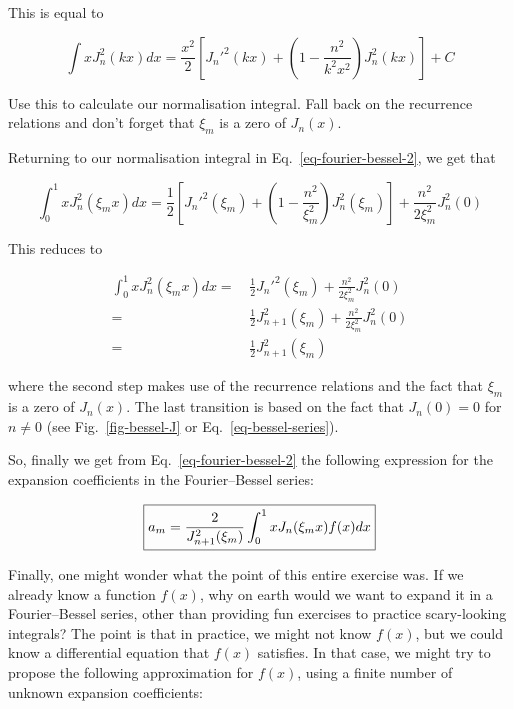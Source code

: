 This is equal to

\begin{equation}
\int x J_n^2(k x) dx = \frac{x^2}{2}\left[{J_n'^2(kx) + \left(1 - \frac{n^2}{k^2x^2}\right) J_n^2(kx)}\right] + C
\end{equation} 

\begin{cue}
Use this to calculate our normalisation integral. Fall back on the recurrence relations and don't forget that $\xi_m$ is a zero of $J_n(x)$.
\end{cue}

Returning to our normalisation integral in Eq.~\ref{eq-fourier-bessel-2}, we get that

\begin{equation}
\int_0^1 x J_n^2(\xi_m x) dx = \frac{1}{2}\left[{J_n'^2(\xi_m) + \left(1 - \frac{n^2}{\xi_m^2}\right) J_n^2(\xi_m)}\right] + \frac{n^2}{2\xi_m^2} J_n^2(0)
\end{equation} 

This reduces to

\begin{align}
\int_0^1 x J_n^2(\xi_m x) dx =& \, \frac{1}{2}J_n'^2(\xi_m) + \frac{n^2}{2\xi_m^2} J_n^2(0) \nonumber \\
 =& \, \frac{1}{2}J_{n+1}^2(\xi_m) + \frac{n^2}{2\xi_m^2} J_n^2(0) \nonumber \\
 =& \, \frac{1}{2}J_{n+1}^2(\xi_m)
\end{align} 

where the second step makes use of the recurrence relations and the fact that $\xi_m$ is a zero of $J_n(x)$. The last transition is based on the fact that $J_n(0)=0$ for $n \ne 0$ (see Fig.~\ref{fig-bessel-J} or Eq.~\ref{eq-bessel-series}).

So, finally we get from Eq.~\ref{eq-fourier-bessel-2} the following expression for the expansion coefficients in the Fourier--Bessel series:

\begin{equation}
\fbox{$\displaystyle
a_m = \frac{2}{J_{n+1}^2(\xi_m)}\int_0^1 x J_n(\xi_m x) f(x) dx
$}
\end{equation} 

Finally, one might wonder what the point of this entire exercise was. If we already know a function $f(x)$, why on earth would we want to expand it in a Fourier--Bessel series, other than providing fun exercises to practice scary-looking integrals? The point is that in practice, we might not know $f(x)$, but we could know a differential equation that $f(x)$ satisfies. In that case, we might try to propose the following approximation for $f(x)$, using a finite number of unknown expansion coefficients:

